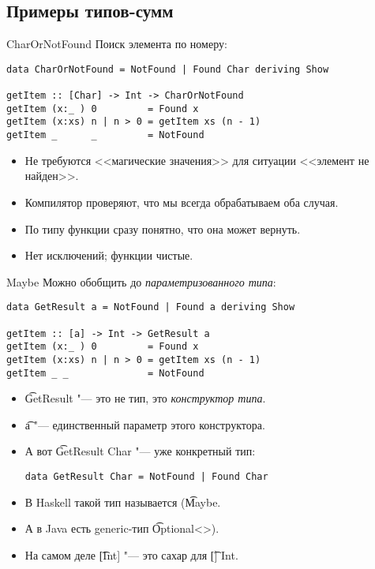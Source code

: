 \subsection{Примеры типов-сумм}
\begin{frame}
\end{frame}

\begin{frame}[fragile]{CharOrNotFound}
	Поиск элемента по номеру:
\begin{verbatim}
data CharOrNotFound = NotFound | Found Char deriving Show

getItem :: [Char] -> Int -> CharOrNotFound
getItem (x:_ ) 0         = Found x
getItem (x:xs) n | n > 0 = getItem xs (n - 1)
getItem _      _         = NotFound
\end{verbatim}
	\begin{itemize}
		\item Не требуются <<магические значения>> для ситуации <<элемент не найден>>.
		\item Компилятор проверяют, что мы всегда обрабатываем оба случая.
		\item По типу функции сразу понятно, что она может вернуть.
		\item Нет исключений; функции чистые.
	\end{itemize}	
\end{frame}


\begin{frame}[fragile]{Maybe}
	Можно обобщить до \textit{параметризованного типа}:
\begin{verbatim}
data GetResult a = NotFound | Found a deriving Show

getItem :: [a] -> Int -> GetResult a
getItem (x:_ ) 0         = Found x
getItem (x:xs) n | n > 0 = getItem xs (n - 1)
getItem _ _              = NotFound
\end{verbatim}
	\begin{itemize}
		\item \t{GetResult} "--- это не тип, это \textit{конструктор типа}.
		\item \t{a} "--- единственный параметр этого конструктора.
		\item А вот \t{GetResult Char} "--- уже конкретный тип:
\begin{verbatim}
data GetResult Char = NotFound | Found Char
\end{verbatim}
		\item В Haskell такой тип называется (\t{Maybe}.
		\item А в Java есть generic-тип \t{Optional<>}).
		\item На самом деле \t{[Int]} "--- это сахар для \t{[] Int}.
	\end{itemize}
\end{frame}

